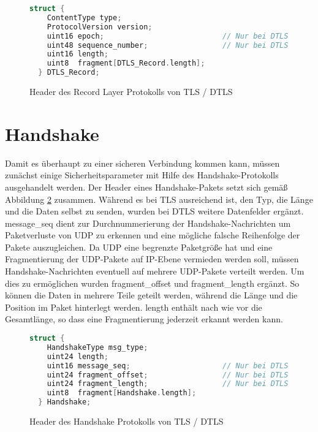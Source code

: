\begin{figure}[ht]
  \centering
  \begin{lstlisting}[language=c]
  struct {
    ContentType type;
    ProtocolVersion version;
    uint16 epoch;                           // Nur bei DTLS
    uint48 sequence_number;                 // Nur bei DTLS
    uint16 length;
    uint8  fragment[DTLS_Record.length];
  } DTLS_Record;
  \end{lstlisting}
  \caption{Header des Record Layer Protokolls von TLS / DTLS}
  \label{fig:recordlayer}
\end{figure}

\section{Handshake}

Damit es überhaupt zu einer sicheren Verbindung kommen kann, müssen zunächst einige Sicherheitsparameter mit Hilfe des Handshake-Protokolls ausgehandelt werden.
Der Header eines Handshake-Pakets setzt sich gemäß Abbildung \ref{fig:handshakelayer} zusammen. Während es bei TLS ausreichend ist, den Typ, die Länge und die Daten selbst
zu senden, wurden bei DTLS weitere Datenfelder ergänzt. message\_seq dient zur Durchnummerierung der Handshake-Nachrichten um Paketverluste von UDP zu erkennen
und eine mögliche falsche Reihenfolge der Pakete auszugleichen. Da UDP eine begrenzte Paketgröße hat und eine Fragmentierung der UDP-Pakete auf IP-Ebene
vermieden werden soll, müssen Handshake-Nachrichten eventuell auf mehrere UDP-Pakete verteilt werden. Um dies zu ermöglichen wurden fragment\_offset und fragment\_length
ergänzt. So können die Daten in mehrere Teile geteilt werden, während die Länge und die Position im Paket hinterlegt werden. length enthält nach wie vor die
Gesamtlänge, so dass eine Fragmentierung jederzeit erkannt werden kann.

\begin{figure}[ht]
  \centering
  \begin{lstlisting}[language=c]
  struct {
    HandshakeType msg_type;
    uint24 length;
    uint16 message_seq;                     // Nur bei DTLS
    uint24 fragment_offset;                 // Nur bei DTLS
    uint24 fragment_length;                 // Nur bei DTLS
    uint8  fragment[Handshake.length];
  } Handshake;
  \end{lstlisting}
  \caption{Header des Handshake Protokolls von TLS / DTLS}
  \label{fig:handshakelayer}
\end{figure}

